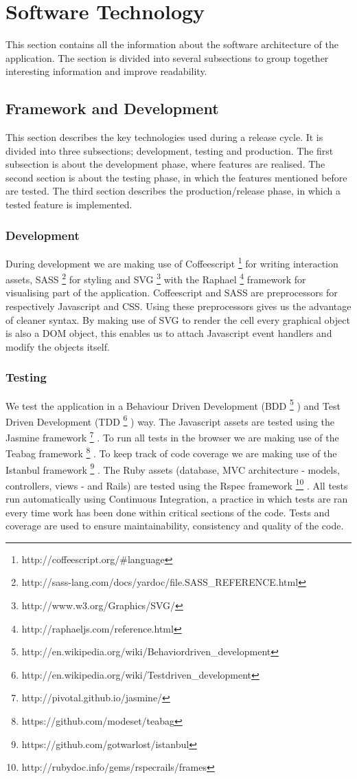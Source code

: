 \documentclass{report}
\begin{document}
	\clearpage
	\section{Software Technology}
		This section contains all the information about the software architecture of the application. The section is divided into several subsections to group together interesting information and improve readability.	
		
		\subsection{Framework and Development}
			This section describes the key technologies used during a release cycle.
			It is divided into three subsections; development, testing and production.
			The first subsection is about the development phase, where features are realised.
			The second section is about the testing phase, in which the features mentioned before are tested.
			The third section describes the production/release phase, in which a tested feature is implemented.
			
			\subsubsection{Development}
				During development we are making use of Coffeescript \footnote{http://coffeescript.org/\#language} for writing interaction assets, SASS \footnote{http://sass-lang.com/docs/yardoc/file.SASS\_REFERENCE.html} for styling and SVG \footnote{http://www.w3.org/Graphics/SVG/} with the Raphael \footnote{http://raphaeljs.com/reference.html} framework for visualising part of the application.
				Coffeescript and SASS are preprocessors for respectively Javascript and CSS. Using these preprocessors gives us the advantage of cleaner syntax.
				By making use of SVG to render the cell every graphical object is also a DOM object, this enables us to attach Javascript event handlers and modify the objects itself.
				
			\subsubsection{Testing}
				We test the application in a Behaviour Driven Development (BDD \footnote{http://en.wikipedia.org/wiki/Behavior\-driven\_development} ) and Test Driven Development (TDD \footnote{http://en.wikipedia.org/wiki/Test\-driven\_development} ) way. 
				The Javascript assets are tested using the Jasmine framework \footnote{http://pivotal.github.io/jasmine/} . 
				To run all tests in the browser we are making use of the Teabag framework \footnote{https://github.com/modeset/teabag} . 
				To keep track of code coverage we are making use of the Istanbul framework \footnote{https://github.com/gotwarlost/istanbul} .
				The Ruby assets (database, MVC architecture - models, controllers, views - and Rails) are tested using the Rspec framework \footnote{http://rubydoc.info/gems/rspec\-rails/frames} .  
				All tests run automatically using Continuous Integration, a practice in which tests are ran every time work has been done within critical sections of the code. 
				Tests and coverage are used to ensure maintainability, consistency and quality of the code.
				
\end{document}
